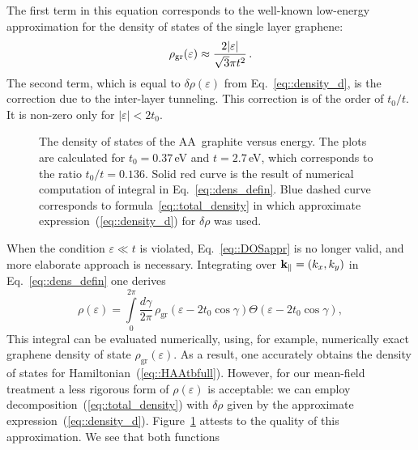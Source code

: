 \documentclass[prb,twocolumn,showpacs,aps,superscriptaddress,floatfix]{revtex4}
\begin{document}
The first term in this equation corresponds to the well-known low-energy
approximation for the density of states of the single layer graphene:
\begin{equation}
\label{eq::grDOS0}
\rho_{\rm gr}(\varepsilon)\approx\frac{2|\varepsilon|}{\sqrt{3}\pi t^2}\,.
\end{equation}
The second term, which is equal to
$\delta\rho(\varepsilon)$
from
Eq.~\eqref{eq::density_d},
is the correction due to the inter-layer tunneling. This correction is of
the order of
$t_0/t$.
It is non-zero only for
$|\varepsilon|<2t_0$.

\begin{figure}[t]
\caption{The density of states of the AA~graphite versus energy. The plots
are calculated for $t_0=0.37$\,eV and $t=2.7$\,eV,
which corresponds to the ratio
$t_0/t=0.136$.
Solid red curve is the result of numerical computation of integral in
Eq.~\eqref{eq::dens_defin}.
Blue dashed curve corresponds to
formula~\eqref{eq::total_density}
in which approximate
expression~(\ref{eq::density_d})
for
$\delta \rho$
was used.
\label{FigDOS}}
\end{figure}
When the condition
$\varepsilon\ll t$
is violated,
Eq.~\eqref{eq::DOSappr}
is no longer valid, and more elaborate approach is necessary. Integrating
over
${\bf k}_\| = (k_x, k_y)$
in
Eq.~\eqref{eq::dens_defin}
one derives
\begin{equation}
\label{eq::DOSAAG2gr}
\rho(\varepsilon)
=\!
\int\limits_{0}^{2\pi}\!\frac{d\gamma}{2\pi}\,
	\rho_{\text{gr}}\!
	\left(\varepsilon-2t_0\cos \gamma \right)
	\Theta \left(\varepsilon-2t_0\cos \gamma \right),
\end{equation}
This integral can be evaluated numerically, using, for example, numerically
exact graphene density of state
$\rho_{\text{gr}}(\varepsilon)$.
As a result, one accurately obtains the density of states for
Hamiltonian~(\ref{eq::HAAtbfull}).
However, for our mean-field treatment a less rigorous form of
$\rho (\varepsilon)$
is acceptable: we can employ
decomposition~(\ref{eq::total_density})
with
$\delta \rho$
given by the approximate
expression~(\ref{eq::density_d}).
Figure~\ref{FigDOS}
attests to the quality of this approximation. We see that both functions
\end{document}
